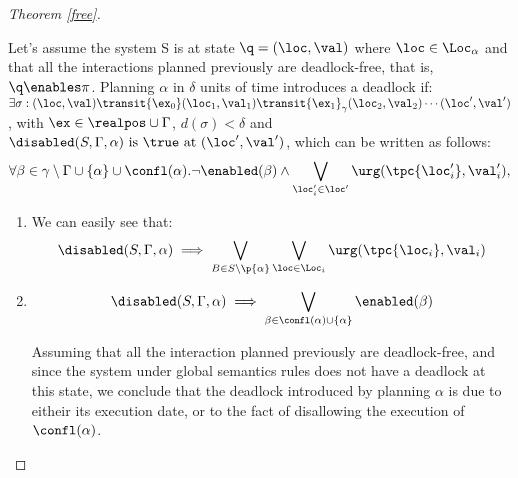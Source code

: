 \begin{proof}[Theorem \ref{free}]
  \label{proof:dis}

  Let's assume the system S is at state $\q=(\loc,\val)$ where $\loc\in\Loc_{\alpha}$ and that all the interactions planned previously 
  are deadlock-free, that is, $\q\enables\pi$. Planning $\alpha$ in $\delta$ units of time introduces a deadlock if:\\
  $\exists\sigma:(\loc,\val)\transit{\ex_0}(\loc_1,\val_1)\transit{\ex_1}_{\gamma}(\loc_2,\val_2)\cdots(\loc',\val')$, with $\ex\in\realpos\cup\Gamma$,
  $d(\sigma)<\delta$ and $\disabled(S,\Gamma,\alpha)\text{ is } \true \text{ at } (\loc',\val')$, which can be written as follows:
  \begin{displaymath}
      \forall\beta\in\gamma\setminus\Gamma\cup\{\alpha\}\cup\confl(\alpha).\neg\enabled(\beta)
      \wedge\bigvee_{\loc'_i\in\loc'}\urg(\tpc{\loc'_i},\val'_i),
\end{displaymath}
  \begin{enumerate}
    \item We can easily see that: \[\disabled(S,\Gamma,\alpha)\implies
    \bigvee_{B\in S\setminus\p{\alpha}}\bigvee_{\loc\in\Loc_i}\urg(\tpc{\loc_i},\val_i)\]
    \item \[\disabled(S,\Gamma,\alpha)\implies \bigvee_{\beta\in \confl(\alpha)\cup\{\alpha\}}\enabled(\beta)\]

      Assuming that all the interaction planned previously are deadlock-free, and since the system under global semantics rules does not have a deadlock at 
      this state, we conclude that the deadlock introduced by planning $\alpha$ is due to eitheir its execution date, or to the fact of disallowing the execution 
      of $\confl(\alpha)$. 
  \end{enumerate}
\end{proof}


